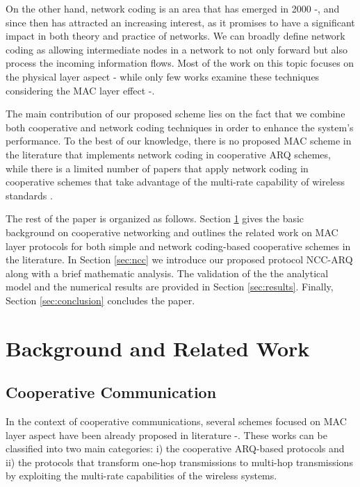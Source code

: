 \documentclass[conference]{IEEEtran}
\begin{document}
On the other hand, network coding is an area that has emerged in 2000 \cite{IEEEhowto:nc1}-\cite{IEEEhowto:nc2}, and since then has attracted an increasing interest, as it promises to have a significant impact in both theory and practice of networks. We can broadly define network coding as allowing intermediate nodes in a network to not only forward but also process the incoming information flows. Most of the work on this topic focuses on the physical layer aspect \cite{IEEEhowto:phync1}-\cite{IEEEhowto:phync4} while only few works examine these techniques considering the MAC layer effect \cite{IEEEhowto:macnc1}-\cite{IEEEhowto:macnc3}.

The main contribution of our proposed scheme lies on the fact that we combine both cooperative and network coding techniques in order to enhance the system's performance. To the best of our knowledge, there is no proposed MAC scheme in the literature that implements network coding in cooperative ARQ schemes, while there is a limited number of papers that apply network coding in cooperative schemes that take advantage of the multi-rate capability of wireless standards \cite{IEEEhowto:mr1}.

The rest of the paper is organized as follows. Section \ref{sec:rw} gives the basic background on cooperative networking and outlines the related work on MAC layer protocols for both simple and network coding-based cooperative schemes in the literature. In Section \ref{sec:ncc} we introduce our proposed protocol NCC-ARQ along with a brief mathematic analysis. The validation of the the analytical model and the numerical results are provided in Section \ref{sec:results}. Finally, Section \ref{sec:conclusion} concludes the paper.

\section{Background and Related Work}
\label{sec:rw}

\subsection{Cooperative Communication}

In the context of cooperative communications, several schemes focused on MAC layer aspect have been already proposed in literature \cite{IEEEhowto:maccoop1}-\cite{IEEEhowto:macmr4}. These works can be classified into two main categories: i) the cooperative ARQ-based protocols and ii) the protocols that transform one-hop transmissions to multi-hop transmissions by exploiting the multi-rate capabilities of the wireless systems.
\end{document}
